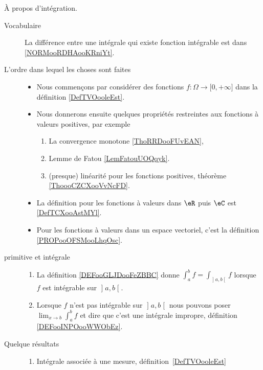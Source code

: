      \label{THEMEooHINHooJaSYQW}

À propos d'intégration.
\begin{description}
	\item[Vocabulaire] La différence entre une intégrale qui existe fonction intégrable est dans \ref{NORMooRDHAooKRniYt}.
	\item[L'ordre dans lequel les choses sont faites]
		\begin{itemize}
			\item
			      Nous commençons par considérer des fonctions \( f\colon \Omega\to \mathopen[ 0 , +\infty \mathclose]\) dans la définition \ref{DefTVOooleEst}.
			\item
			      Nous donnerons ensuite quelques propriétés restreintes aux fonctions à valeurs positives, par exemple
			      \begin{enumerate}
				      \item
				            La convergence monotone \ref{ThoRRDooFUvEAN},
				      \item
				            Lemme de Fatou \ref{LemFatouUOQqyk}.
				      \item
				            (presque) linéarité pour les fonctions positives, théorème \ref{ThoooCZCXooVvNcFD}.
			      \end{enumerate}
			\item
			      La définition pour les fonctions à valeurs dans \( \eR\) puis \( \eC\) est \ref{DefTCXooAstMYl}.
			\item
			      Pour les fonctions à valeurs dans un espace vectoriel, c'est la définition \ref{PROPooOFSMooLhqOsc}.
		\end{itemize}
	\item[primitive et intégrale]
		\begin{enumerate}
			\item
			      La définition \ref{DEFooGLJDooFeZBBC} donne \( \int_a^bf=\int_{\mathopen] a ,b \mathclose[}f\) lorsque \( f\) est intégrable sur \( \mathopen] a , b \mathclose[\).
			\item Lorsque \( f\) n'est pas intégrable sur \( \mathopen] a , b \mathclose[\) nous pouvons poser \( \lim_{x\to b} \int_a^bf\) et dire que c'est une intégrale impropre, définition \ref{DEFooINPOooWWObEz}.
		\end{enumerate}
	\item[Quelque résultats]
		\begin{enumerate}
			\item
			      Intégrale associée à une mesure, définition~\ref{DefTVOooleEst}

\end{enumerate}
\end{description}
